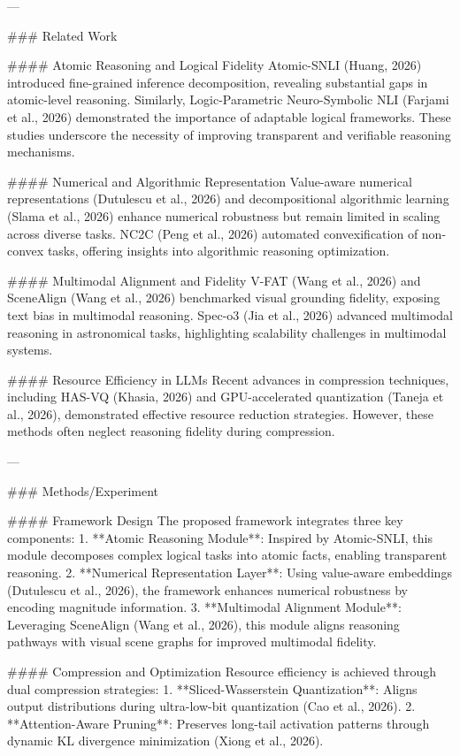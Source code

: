 ---

### Related Work

#### Atomic Reasoning and Logical Fidelity
Atomic-SNLI (Huang, 2026) introduced fine-grained inference decomposition, revealing substantial gaps in atomic-level reasoning. Similarly, Logic-Parametric Neuro-Symbolic NLI (Farjami et al., 2026) demonstrated the importance of adaptable logical frameworks. These studies underscore the necessity of improving transparent and verifiable reasoning mechanisms.

#### Numerical and Algorithmic Representation
Value-aware numerical representations (Dutulescu et al., 2026) and decompositional algorithmic learning (Slama et al., 2026) enhance numerical robustness but remain limited in scaling across diverse tasks. NC2C (Peng et al., 2026) automated convexification of non-convex tasks, offering insights into algorithmic reasoning optimization.

#### Multimodal Alignment and Fidelity
V-FAT (Wang et al., 2026) and SceneAlign (Wang et al., 2026) benchmarked visual grounding fidelity, exposing text bias in multimodal reasoning. Spec-o3 (Jia et al., 2026) advanced multimodal reasoning in astronomical tasks, highlighting scalability challenges in multimodal systems.

#### Resource Efficiency in LLMs
Recent advances in compression techniques, including HAS-VQ (Khasia, 2026) and GPU-accelerated quantization (Taneja et al., 2026), demonstrated effective resource reduction strategies. However, these methods often neglect reasoning fidelity during compression.

---

### Methods/Experiment

#### Framework Design
The proposed framework integrates three key components:
1. **Atomic Reasoning Module**: Inspired by Atomic-SNLI, this module decomposes complex logical tasks into atomic facts, enabling transparent reasoning.
2. **Numerical Representation Layer**: Using value-aware embeddings (Dutulescu et al., 2026), the framework enhances numerical robustness by encoding magnitude information.
3. **Multimodal Alignment Module**: Leveraging SceneAlign (Wang et al., 2026), this module aligns reasoning pathways with visual scene graphs for improved multimodal fidelity.

#### Compression and Optimization
Resource efficiency is achieved through dual compression strategies:
1. **Sliced-Wasserstein Quantization**: Aligns output distributions during ultra-low-bit quantization (Cao et al., 2026).
2. **Attention-Aware Pruning**: Preserves long-tail activation patterns through dynamic KL divergence minimization (Xiong et al., 2026).

